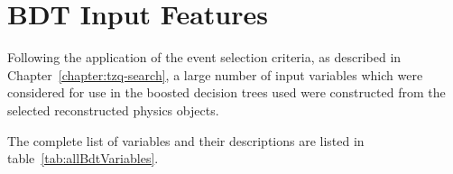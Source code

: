 \chapter{BDT Input Features}\label{app:bdt}
Following the application of the event selection criteria, as described in Chapter~\ref{chapter:tzq-search}, a large number of input variables which were considered for use in the boosted decision trees used were constructed from the selected reconstructed physics objects.

The complete list of variables and their descriptions are listed in table~\ref{tab:allBdtVariables}.

